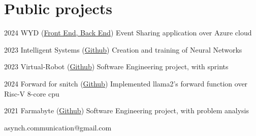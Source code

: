 \documentclass{tccv}
\begin{document}
\section{Public projects}

\begin{yearlist}
      \item{2024}
            {WYD (\href{https://github.com/RedDuality/WYD/tree/main/frontend/wyd_front}{Front End, } \href{https://github.com/RedDuality/WYD_back}{Back End})}
            {Event Sharing application over Azure cloud}
      \item{2023}
            {Intelligent Systems (\href{https://github.com/RedDuality/IntelligentSystems}{Github})}
            {Creation and training of Neural Networks}
      \item{2023}
            {Virtual-Robot (\href{https://github.com/RedDuality/issLab23}{Github})}
            {Software Engineering project, with sprints}
      \item{2024}
            {Forward for snitch (\href{https://github.com/RedDuality/snitch_forward}{Github})}
            {Implemented llama2's forward function over Risc-V 8-core cpu}
      \item{2021}
            {Farmabyte (\href{https://github.com/lorenzo9uerra/farmabyte-doc} {Github})}
            {Software Engineering project, with problem analysis}
            
\end{yearlist}


{asynch.communication@gmail.com}
{}
\end{document}
